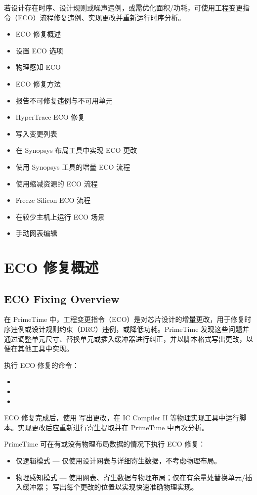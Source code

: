 \label{chap:eco}

若设计存在时序、设计规则或噪声违例，或需优化面积/功耗，可使用工程变更指令（ECO）流程修复违例、实现更改并重新运行时序分析。
\begin{itemize}
  \item ECO 修复概述
  \item 设置 ECO 选项
  \item 物理感知 ECO
  \item ECO 修复方法
  \item 报告不可修复违例与不可用单元
  \item HyperTrace ECO 修复
  \item 写入变更列表
  \item 在 Synopsys 布局工具中实现 ECO 更改
  \item 使用 Synopsys 工具的增量 ECO 流程
  \item 使用缩减资源的 ECO 流程
  \item Freeze Silicon ECO 流程
  \item 在较少主机上运行 ECO 场景
  \item 手动网表编辑
\end{itemize}

\section{ECO 修复概述}
\subsection*{ECO Fixing Overview}

在 PrimeTime 中，工程变更指令（ECO）是对芯片设计的增量更改，用于修复时序违例或设计规则约束（DRC）违例，或降低功耗。PrimeTime 发现这些问题并通过调整单元尺寸、替换单元或插入缓冲器进行纠正，并以脚本格式写出更改，以便在其他工具中实现。

执行 ECO 修复的命令：
\begin{itemize}
  \item {}
  \item {}
  \item {}
\end{itemize}

ECO 修复完成后，使用  写出更改，在 IC Compiler II 等物理实现工具中运行脚本。实现更改后应重新进行寄生提取并在 PrimeTime 中再次分析。

PrimeTime 可在有或没有物理布局数据的情况下执行 ECO 修复：
\begin{itemize}
  \item 仅逻辑模式 — 仅使用设计网表与详细寄生数据，不考虑物理布局。
  \item 物理感知模式 — 使用网表、寄生数据与物理布局；仅在有余量处替换单元/插入缓冲器； 写出每个更改的位置以实现快速准确物理实现。
\end{itemize}

